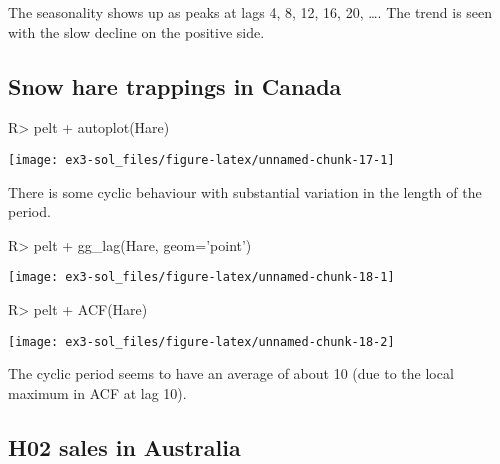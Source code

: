 \documentclass[
]{article}
\begin{document}
The seasonality shows up as peaks at lags 4, 8, 12, 16, 20, \ldots. The trend is seen with the slow decline on the positive side.

\hypertarget{snow-hare-trappings-in-canada}{%
\subsection{Snow hare trappings in Canada}\label{snow-hare-trappings-in-canada}}

\begin{CodeChunk}
\begin{CodeInput}
R> pelt %
+   autoplot(Hare)
\end{CodeInput}


\begin{center}\texttt{[image: ex3-sol\_files/figure-latex/unnamed-chunk-17-1]} \end{center}

\end{CodeChunk}

There is some cyclic behaviour with substantial variation in the length of the period.

\begin{CodeChunk}
\begin{CodeInput}
R> pelt %
+   gg_lag(Hare, geom='point')
\end{CodeInput}


\begin{center}\texttt{[image: ex3-sol\_files/figure-latex/unnamed-chunk-18-1]} \end{center}

\begin{CodeInput}
R> pelt %
+   ACF(Hare) %
\end{CodeInput}


\begin{center}\texttt{[image: ex3-sol\_files/figure-latex/unnamed-chunk-18-2]} \end{center}

\end{CodeChunk}

The cyclic period seems to have an average of about 10 (due to the local maximum in ACF at lag 10).

\hypertarget{h02-sales-in-australia}{%
\subsection{H02 sales in Australia}\label{h02-sales-in-australia}}
\end{document}
